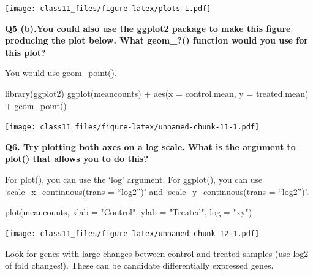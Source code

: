\documentclass[
]{article}
\newenvironment{Shaded}{\begin{snugshade}}{\end{snugshade}}
\newcommand{\AttributeTok}[1]{\textcolor[rgb]{0.77,0.63,0.00}{#1}}
\newcommand{\FunctionTok}[1]{\textcolor[rgb]{0.00,0.00,0.00}{#1}}
\newcommand{\NormalTok}[1]{#1}
\newcommand{\OtherTok}[1]{\textcolor[rgb]{0.56,0.35,0.01}{#1}}
\newcommand{\SpecialCharTok}[1]{\textcolor[rgb]{0.00,0.00,0.00}{#1}}
\newcommand{\StringTok}[1]{\textcolor[rgb]{0.31,0.60,0.02}{#1}}
\begin{document}
\texttt{[image: class11\_files/figure-latex/plots-1.pdf]}

\textbf{Q5 (b).You could also use the ggplot2 package to make this
figure producing the plot below. What geom\_?() function would you use
for this plot?}

You would use geom\_point().

\begin{Shaded}
\begin{Highlighting}[]
\FunctionTok{library}\NormalTok{(ggplot2)}
\FunctionTok{ggplot}\NormalTok{(meancounts) }\SpecialCharTok{+}
  \FunctionTok{aes}\NormalTok{(}\AttributeTok{x =}\NormalTok{ control.mean, }\AttributeTok{y =}\NormalTok{ treated.mean) }\SpecialCharTok{+} 
  \FunctionTok{geom\_point}\NormalTok{()}
\end{Highlighting}
\end{Shaded}

\texttt{[image: class11\_files/figure-latex/unnamed-chunk-11-1.pdf]}

\textbf{Q6. Try plotting both axes on a log scale. What is the argument
to plot() that allows you to do this?}

For plot(), you can use the `log' argument. For ggplot(), you can use
`scale\_x\_continuous(trans = ``log2'')' and `scale\_y\_continuous(trans
= ``log2'')'.

\begin{Shaded}
\begin{Highlighting}[]
\FunctionTok{plot}\NormalTok{(meancounts, }\AttributeTok{xlab =} \StringTok{"Control"}\NormalTok{, }\AttributeTok{ylab =} \StringTok{"Treated"}\NormalTok{, }\AttributeTok{log =} \StringTok{"xy"}\NormalTok{)}
\end{Highlighting}
\end{Shaded}

\texttt{[image: class11\_files/figure-latex/unnamed-chunk-12-1.pdf]}

Look for genes with large changes between control and treated samples
(use log2 of fold changes!). These can be candidate differentially
expressed genes.

\begin{Shaded}
\end{Shaded}
\end{document}
